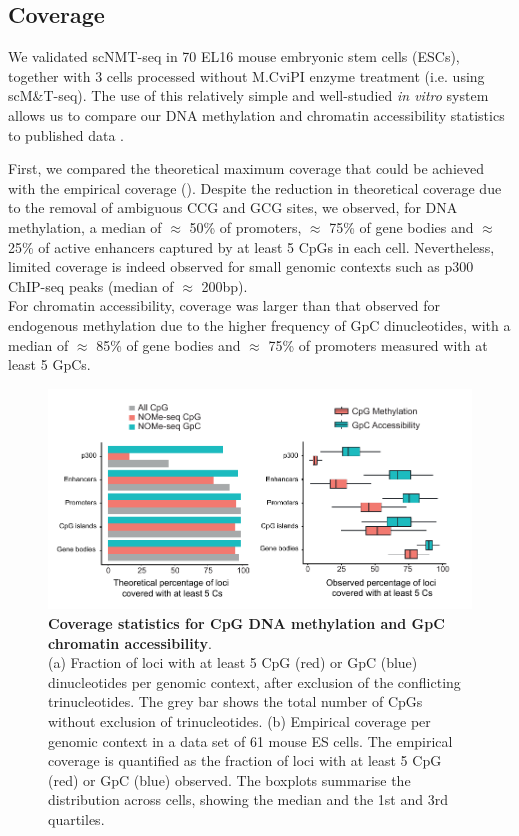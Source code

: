 \subsection{Coverage} \label{section:scnmt_coverage}

We validated scNMT-seq in 70 EL16 mouse embryonic stem cells (ESCs), together with 3 cells processed without M.CviPI enzyme treatment (i.e. using scM\&T-seq). The use of this relatively simple and well-studied \textit{in vitro} system allows us to compare our DNA methylation and chromatin accessibility statistics to published data \cite{Smallwood2014,Angermueller2016,Ficz2013}.

First, we compared the theoretical maximum coverage that could be achieved with the empirical coverage (). Despite the reduction in theoretical coverage due to the removal of ambiguous CCG and GCG sites, we observed, for DNA methylation, a median of $\approx$ 50\% of promoters, $\approx$ 75\% of gene bodies and $\approx$ 25\% of active enhancers captured by at least 5 CpGs in each cell. Nevertheless, limited coverage is indeed observed for small genomic contexts such as p300 ChIP-seq peaks (median of $\approx$ 200bp).\\
For chromatin accessibility, coverage was larger than that observed for endogenous methylation due to the higher frequency of GpC dinucleotides, with a median of $\approx$ 85\% of gene bodies and $\approx$ 75\% of promoters measured with at least 5 GpCs.

\begin{figure}[H]
	\centering
	\includegraphics[width=1.0\linewidth]{scNMT_coverage}
	\caption[]{\textbf{Coverage statistics for CpG DNA methylation and GpC chromatin accessibility}.\\ 
	(a) Fraction of loci with at least 5 CpG (red) or GpC (blue) dinucleotides per genomic context, after exclusion of the conflicting trinucleotides. The grey bar shows the total number of CpGs without exclusion of trinucleotides. (b) Empirical coverage per genomic context in a data set of 61 mouse ES cells. The empirical coverage is quantified as the fraction of loci with at least 5 CpG (red) or GpC (blue) observed. The boxplots summarise the distribution across cells, showing the median and the 1st and 3rd quartiles.}
	\label{fig:scnmt_coverage}
\end{figure}

